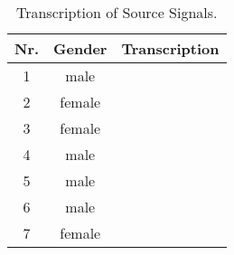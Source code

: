 \begin{table}[htb]
	\small
	\begin{tabularx}{\textwidth}{ccX}
		\toprule
		Nr. & Gender & Transcription                                       \\
		\midrule
		1   & male   &            \\
		2   & female &            \\
		3   & female &            \\
		4   & male   &            \\
		5   & male   &            \\
		6   & male   &            \\
		7   & female & \itshape{} \\
		\bottomrule
	\end{tabularx}
	\caption[Transcription of Source Signals]{Transcription of Source Signals.}
	\label{table:source-signals}
\end{table}